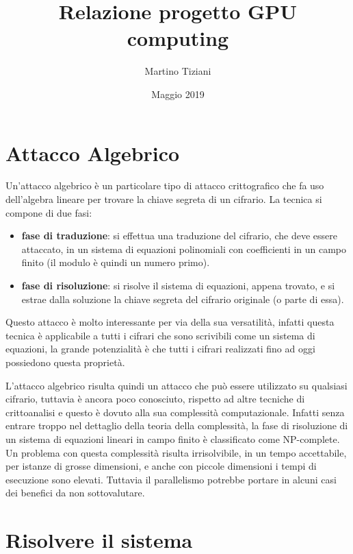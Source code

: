 \documentclass{article}
\title{Relazione progetto GPU computing}
\author{Martino Tiziani}
\date{Maggio 2019}
\begin{document}
\maketitle

\section{Attacco Algebrico}

Un'attacco algebrico è un particolare tipo di attacco crittografico che fa uso dell'algebra lineare per trovare la chiave segreta di un cifrario. La tecnica si compone di due fasi:

\begin{itemize}
\item \textbf{fase di traduzione}: si effettua una traduzione del cifrario, che deve essere attaccato, in un sistema di equazioni polinomiali con coefficienti in un campo finito (il modulo è quindi un numero primo).

\item \textbf{fase di risoluzione}: si risolve il sistema di equazioni, appena trovato, e si estrae dalla soluzione la chiave segreta del cifrario originale (o parte di essa).

\end{itemize}

Questo attacco è molto interessante per via della sua versatilità, infatti questa tecnica è applicabile a tutti i cifrari che sono scrivibili come un sistema di equazioni, la grande potenzialità è che tutti i cifrari realizzati fino ad oggi possiedono questa proprietà. 

L'attacco algebrico risulta quindi un attacco che può essere utilizzato su qualsiasi cifrario, tuttavia è ancora poco conosciuto, rispetto ad altre tecniche di crittoanalisi e questo è dovuto alla sua complessità computazionale. Infatti senza entrare troppo nel dettaglio della teoria della complessità, la fase di risoluzione di un sistema di equazioni lineari in campo finito è classificato come NP-complete. Un problema con questa complessità risulta irrisolvibile, in un tempo accettabile, per istanze di grosse dimensioni, e anche con piccole dimensioni i tempi di esecuzione sono elevati. Tuttavia il parallelismo potrebbe portare in alcuni casi dei benefici da non sottovalutare.

\section{Risolvere il sistema}
\end{document}
